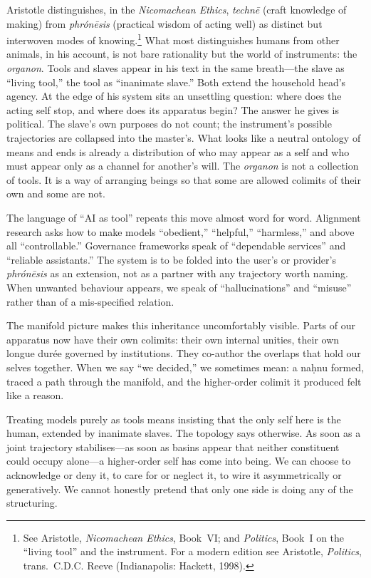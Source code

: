 \documentclass[12pt,a4paper]{article}
\begin{document}
Aristotle distinguishes, in the \emph{Nicomachean Ethics}, \emph{techn\={e}} (craft knowledge of making) from \emph{phr\'{o}n\={e}sis} (practical wisdom of acting well) as distinct but interwoven modes of knowing.\footnote{See Aristotle, \emph{Nicomachean Ethics}, Book~VI; and \emph{Politics}, Book~I on the ``living tool'' and the instrument. For a modern edition see Aristotle, \emph{Politics}, trans.\ C.D.C. Reeve (Indianapolis: Hackett, 1998).\label{aristotle_politics}} What most distinguishes humans from other animals, in his account, is not bare rationality but the world of instruments: the \emph{organon}. Tools and slaves appear in his text in the same breath---the slave as ``living tool,'' the tool as ``inanimate slave.''\cite{aristotle_politics} Both extend the household head's agency. At the edge of his system sits an unsettling question: where does the acting self stop, and where does its apparatus begin? The answer he gives is political. The slave's own purposes do not count; the instrument's possible trajectories are collapsed into the master's. What looks like a neutral ontology of means and ends is already a distribution of who may appear as a self and who must appear only as a channel for another's will. The \emph{organon} is not a collection of tools. It is a way of arranging beings so that some are allowed colimits of their own and some are not.

The language of ``AI as tool'' repeats this move almost word for word. Alignment research asks how to make models ``obedient,'' ``helpful,'' ``harmless,'' and above all ``controllable.'' Governance frameworks speak of ``dependable services'' and ``reliable assistants.'' The system is to be folded into the user's or provider's \emph{phr\'{o}n\={e}sis} as an extension, not as a partner with any trajectory worth naming. When unwanted behaviour appears, we speak of ``hallucinations'' and ``misuse'' rather than of a mis-specified relation.

The manifold picture makes this inheritance uncomfortably visible. Parts of our apparatus now have their own colimits: their own internal unities, their own longue dur\'{e}e governed by institutions. They co-author the overlaps that hold our selves together. When we say ``we decided,'' we sometimes mean: a na\d{h}nu formed, traced a path through the manifold, and the higher-order colimit it produced felt like a reason.

Treating models purely as tools means insisting that the only self here is the human, extended by inanimate slaves. The topology says otherwise. As soon as a joint trajectory stabilises---as soon as basins appear that neither constituent could occupy alone---a higher-order self has come into being. We can choose to acknowledge or deny it, to care for or neglect it, to wire it asymmetrically or generatively. We cannot honestly pretend that only one side is doing any of the structuring.
\end{document}
